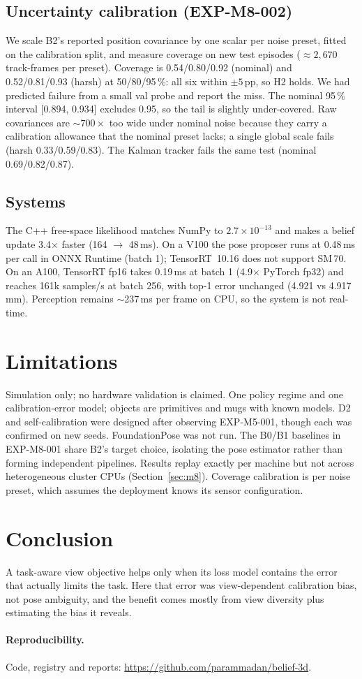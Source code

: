 \documentclass[10pt,twocolumn]{article}
\begin{document}
\subsection{Uncertainty calibration (EXP-M8-002)}
We scale B2's reported position covariance by one scalar per noise preset, fitted on the
calibration split, and measure coverage on new test episodes (${\approx}2{,}670$ track-frames per
preset). Coverage is 0.54/0.80/0.92 (nominal) and 0.52/0.81/0.93 (harsh) at 50/80/95\,\%: all
six within $\pm5$\,pp, so H2 holds. We had predicted failure from a small val probe and report the
miss. The nominal 95\,\% interval [0.894, 0.934] excludes 0.95, so the tail is slightly
under-covered. Raw covariances are ${\sim}700\times$ too wide under nominal noise because they carry
a calibration allowance that the nominal preset lacks; a single global scale fails (harsh
0.33/0.59/0.83). The Kalman tracker fails the same test (nominal 0.69/0.82/0.87).

\subsection{Systems}
The C++ free-space likelihood matches NumPy to $2.7\times10^{-13}$ and makes a belief update
3.4$\times$ faster (164 $\rightarrow$ 48\,ms). On a V100 the pose proposer runs at 0.48\,ms per
call in ONNX Runtime (batch 1); TensorRT~10.16 does not support SM\,70.
On an A100, TensorRT fp16 takes 0.19\,ms at batch 1 (4.9$\times$ PyTorch fp32) and reaches
161k samples/s at batch 256, with top-1 error unchanged (4.921 vs 4.917\,mm). Perception remains ${\sim}$237\,ms per frame on
CPU, so the system is not real-time.

\section{Limitations}\label{sec:limits}
Simulation only; no hardware validation is claimed. One policy regime and one calibration-error
model; objects are primitives and mugs with known models. D2 and self-calibration were designed
after observing EXP-M5-001, though each was confirmed on new seeds. FoundationPose was not run.
The B0/B1 baselines in EXP-M8-001 share B2's target choice, isolating the pose estimator rather
than forming independent pipelines. Results replay exactly per machine but not across
heterogeneous cluster CPUs (Section~\ref{sec:m8}). Coverage calibration is per noise preset, which
assumes the deployment knows its sensor configuration.

\section{Conclusion}
A task-aware view objective helps only when its loss model contains the error that actually
limits the task. Here that error was view-dependent calibration bias, not pose ambiguity, and the
benefit comes mostly from view diversity plus estimating the bias it reveals.

\paragraph{Reproducibility.} Code, registry and reports:
\url{https://github.com/parammadan/belief-3d}.



\end{document}
